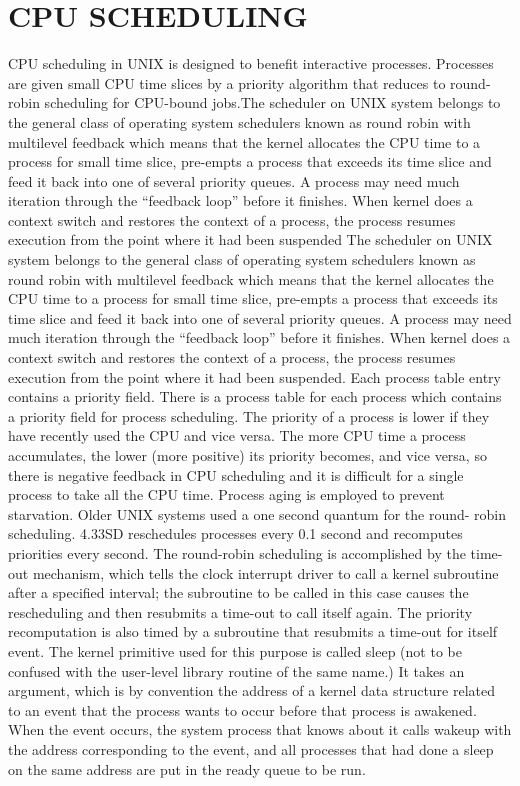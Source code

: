 \documentclass{article}
\begin{document}
\section{CPU SCHEDULING}

CPU scheduling in UNIX is designed to benefit interactive processes. Processes are
given small CPU time slices by a priority algorithm that reduces to round-robin
scheduling for CPU-bound jobs.The scheduler on UNIX system belongs to the general class of operating system schedulers known as round robin with multilevel feedback which means that the kernel allocates the CPU time to a process for small time slice, pre-empts a process
that exceeds its time slice and feed it back into one of several priority queues. A
process may need much iteration through the “feedback loop” before it finishes. When
kernel does a context switch and restores the context of a process, the process resumes
execution from the point where it had been suspended
The scheduler on UNIX system belongs to the general class of operating system
schedulers known as round robin with multilevel feedback which means that the
kernel allocates the CPU time to a process for small time slice, pre-empts a process
that exceeds its time slice and feed it back into one of several priority queues. A
process may need much iteration through the “feedback loop” before it finishes. When
kernel does a context switch and restores the context of a process, the process resumes
execution from the point where it had been suspended. 
Each process table entry contains a priority field. There is a process table for each
process which contains a priority field for process scheduling. The priority of a
process is lower if they have recently used the CPU and vice versa.
The more CPU time a process accumulates, the lower (more positive) its priority
becomes, and vice versa, so there is negative feedback in CPU scheduling and it is
difficult for a single process to take all the CPU time. Process aging is employed to
prevent starvation.
Older UNIX systems used a one second quantum for the round- robin scheduling.
4.33SD reschedules processes every 0.1 second and recomputes priorities every
second. The round-robin scheduling is accomplished by the time-out mechanism,
which tells the clock interrupt driver to call a kernel subroutine after a specified
interval; the subroutine to be called in this case causes the rescheduling and then
resubmits a time-out to call itself again. The priority recomputation is also timed by a
subroutine that resubmits a time-out for itself event. The kernel primitive used for this
purpose is called sleep (not to be confused with the user-level library routine of the
same name.) It takes an argument, which is by convention the address of a kernel data
structure related to an event that the process wants to occur before that process is
awakened. When the event occurs, the system process that knows about it calls
wakeup with the address corresponding to the event, and all processes that had done a
sleep on the same address are put in the ready queue to be run.
\end{document}
